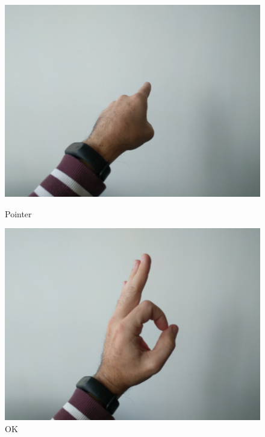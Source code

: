 \begin{figure}%
	\label{fig:photoGestes}%
	\begin{minipage}[c]{.32\linewidth}
		\includegraphics[width=\columnwidth]{figures/1.jpg}%
		\caption*{Pointer}%
	\end{minipage} \hfill
	\begin{minipage}[c]{.32\linewidth}
		\includegraphics[width=\columnwidth]{figures/2.jpg}%
		\caption*{OK}%
	\end{minipage} \hfill
	\begin{minipage}[c]{.32\linewidth}

\end{minipage}
\end{figure}
